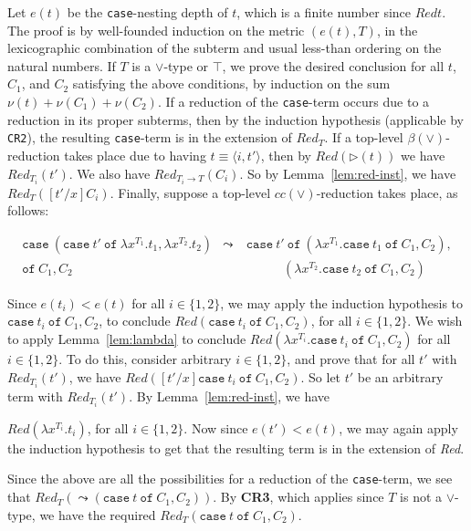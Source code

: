 \documentclass{article}
\newcommand{\red}[0]{\textit{Red}}
\newcommand{\redsub}[1]{\textit{Red}(\rhd(#1))}
\begin{document}
\noindent Let $e(t)$ be the \texttt{case}-nesting depth of $t$, which
is a finite number since $\red{t}$.  The proof is by well-founded
induction on the metric $(e(t),T)$, in the lexicographic combination of
the subterm and usual less-than ordering on the natural numbers.  If
$T$ is a $\vee$-type or $\top$, we prove the desired conclusion for
all $t$, $C_1$, and $C_2$ satisfying the above conditions, by
induction on the sum $\nu(t)+\nu(C_1)+\nu(C_2)$.  If a reduction of
the \texttt{case}-term occurs due to a reduction in its proper
subterms, then by the induction hypothesis (applicable by
\texttt{CR2}), the resulting \texttt{case}-term is in the extension of
$\red_{T}$.  If a top-level $\beta(\vee)$-reduction takes place due to
having $t\equiv \langle i, t'\rangle$, then by $\redsub{t}$ we have
$\red_{T_i}(t')$.  We also have $\red_{T_i\to T}(C_i)$.  So by
Lemma~\ref{lem:red-inst}, we have $\red_T([t'/x]C_i)$.  Finally,
suppose a top-level $\textit{cc}(\vee)$-reduction takes place, as
follows:

\[
\begin{array}{lll}
\texttt{case}\ (\texttt{case}\ t'\ \texttt{of}\ \lambda x^{T_1}.t_1,\lambda x^{T_2}.t_2) & \leadsto &\ 
\texttt{case}\ t'\ \texttt{of}\ (\lambda x^{T_1}.\texttt{case}\ t_1\ \texttt{of}\ C_1, C_2),\\
\texttt{of}\ C_1, C_2 \ & \ &
\ \ \ \ \ \ \ \ \ \ \ \ \ \ (\lambda x^{T_2}.\texttt{case}\ t_2\ \texttt{of}\ C_1, C_2)
\end{array}
\]

\noindent Since $e(t_i) < e(t)$ for all $i\in\{1,2\}$, we may apply
the induction hypothesis to $\texttt{case}\ t_i\ \texttt{of}\ C_1,
C_2$, to conclude $\red(\texttt{case}\ t_i\ \texttt{of}\ C_1, C_2)$,
for all $i\in\{1,2\}$.  We wish to apply Lemma~\ref{lem:lambda} to
conclude $\red(\lambda x^{T_i}. \texttt{case}\ t_i\ \texttt{of}\ C_1,
C_2)$ for all $i\in\{1,2\}$.  To do this, consider arbitrary
$i\in\{1,2\}$, and prove that for all $t'$ with $\red_{T_i}(t')$, we
have $\red([t'/x]\texttt{case}\ t_i\ \texttt{of}\ C_1, C_2)$.  So
let $t'$ be an arbitrary term with $\red_{T_i}(t')$.  By Lemma~\ref{lem:red-inst},
we have 



$\red(\lambda x^{T_i}.t_i)$, for all $i\in\{1,2\}$.  
Now since $e(t') < e(t)$, we may again apply
the induction hypothesis to get that the resulting term is in the
extension of \red.

Since the above are all the possibilities for a reduction of the
\texttt{case}-term, we see that $\red_{T}(\leadsto(\texttt{case}\ t\
\texttt{of}\ C_1,C_2))$.  By \textbf{CR3}, which applies since $T$ is
not a $\vee$-type, we have the required $\red_{T}(\texttt{case}\ t\
\texttt{of}\ C_1,C_2)$.
\end{document}

